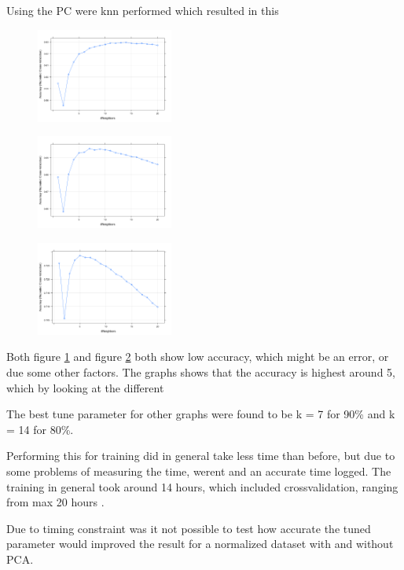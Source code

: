 Using the PC were knn performed which resulted in this

\begin{figure}[H]
\centering
\includegraphics[width = 0.4\textwidth]{graphics/kNN_plot_80.png}
\label{fig:knnFit_80}
\caption{}
\end{figure}


\begin{figure}[H]
\centering
\includegraphics[width = 0.4\textwidth]{graphics/kNN_plot_90.png}
\label{fig:knnFit_90}
\caption{}
\end{figure}


\begin{figure}[H]
\centering
\includegraphics[width = 0.4\textwidth]{graphics/kNN_plot_99.png}
\label{fig:knnFit_99}
\caption{}
\end{figure}

Both figure \ref{fig:knnFit_80} and figure \ref{fig:knnFit_90} both show low accuracy,
which might be an error, or due some other factors. 
 The graphs shows that the accuracy is highest around 5, which by looking at the different

The best tune parameter for other graphs were found to be k = 7 for 90\% and k = 14 for 80\%.



Performing this for training did in general take less time than before, but due to some problems of measuring the time, werent and an accurate time logged.  The training in general took around 14 hours, which included crossvalidation, ranging from max 20 hours . 

Due to timing constraint was it not possible to test how accurate the tuned parameter would improved the result for a normalized dataset with and without PCA. 

